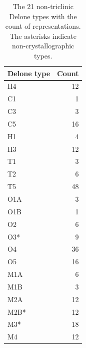 \documentclass[preprint]{iucr}              %
\begin{document}
	
	
	
	
	
	\begin{table}
		\caption{The 21 non-triclinic Delone types with the count of representations.
			The asterisks indicate non-crystallographic types.}
		\label{table:TypeCounts}
		\begin{tabular}{lr}
			Delone type & Count    \\
			\midrule
			H4&12\\
			C1&1\\
			C3&3\\
			C5&16\\
			H1&4\\
			H3&12\\
			T1&3\\
			T2&6\\
			T5&48\\
			O1A&3\\
			O1B&1\\
			O2&6\\
			O3*&9\\
			O4&36\\
			O5&16\\
			M1A&6\\
			M1B&3\\
			M2A&12\\
			M2B*&12\\
			M3*&18\\
			M4&12\\
			\bottomrule
		\end{tabular}
	\end{table}
	
\end{document}
